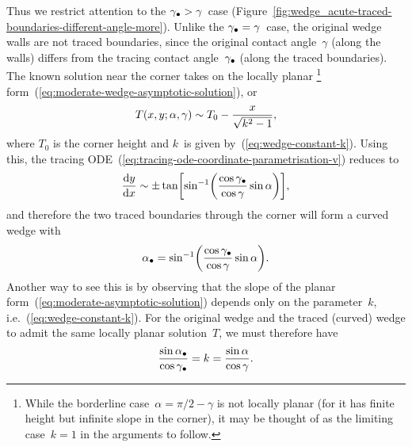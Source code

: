 Thus we restrict attention to the $\gamma_\bullet > \gamma$~case
(Figure~\ref{fig:wedge_acute-traced-boundaries-different-angle-more}).
Unlike the $\gamma_\bullet = \gamma$~case,
the original wedge walls are not traced boundaries,
since the original contact angle~$\gamma$
(along the walls)
differs from the tracing contact angle~$\gamma_\bullet$
(along the traced boundaries).
The known solution near the corner takes on
the locally planar%
\footnote{
  While the borderline case~$\alpha = \pi/2 - \gamma$ is not locally planar
  (for it has finite height but infinite slope in the corner),
  it may be thought of as the limiting case~$k = 1$
  in the arguments to follow.
}
form~(\ref{eq:moderate-wedge-asymptotic-solution}),
or
\begin{equation}
  T (x, y; \alpha, \gamma) \sim T_0 - \frac{x}{\sqrt{k^2 - 1}},
  \label{eq:moderate-asymptotic-solution}
\end{equation}
where $T_0$ is the corner height
and $k$~is given by~(\ref{eq:wedge-constant-k}).
Using this,
the tracing ODE~(\ref{eq:tracing-ode-coordinate-parametrisation-v})
reduces to
\begin{equation}
  \tder{y}{x} \asy
    \pm \tan\squarebr*{
      \sin^{-1}\roundbr*{
        \frac{\cos\gamma_\tr}{\cos\gamma} \sin\alpha
      }
    },
  \label{eq:moderate-asymptotic-tracing-ode-different-angle}
\end{equation}
and therefore the two traced boundaries through the corner
will form a curved wedge with 
\begin{equation}
  \alpha_\tr =
    \sin^{-1}\roundbr*{
      \frac{\cos\gamma_\tr}{\cos\gamma} \sin\alpha
    }.
  \label{eq:moderate-reduced-half-angle}
\end{equation}
Another way to see this is by observing that
the slope of the planar form~(\ref{eq:moderate-asymptotic-solution})
depends only on the parameter~$k$, i.e.~(\ref{eq:wedge-constant-k}).
For the original wedge and the traced (curved) wedge
to admit the same locally planar solution~$T$,
we must therefore have
\begin{equation}
  \frac{\sin\alpha_\bullet}{\cos\gamma_\bullet} = k = \frac{\sin\alpha}{\cos\gamma}.
  \label{eq:moderate-constant-k-different-angle}
\end{equation}

